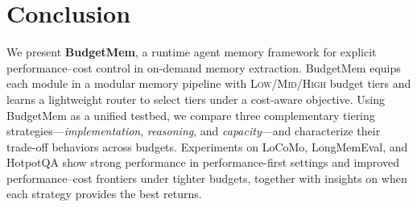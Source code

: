 \section{Conclusion}
\label{sec:conclusion}



We present \textbf{BudgetMem}, a runtime agent memory framework for explicit performance--cost control in on-demand memory extraction. BudgetMem equips each module in a modular memory pipeline with \textsc{Low}/\textsc{Mid}/\textsc{High} budget tiers and learns a lightweight router to select tiers under a cost-aware objective. Using BudgetMem as a unified testbed, we compare three complementary tiering strategies---\textit{implementation}, \textit{reasoning}, and \textit{capacity}---and characterize their trade-off behaviors across budgets. Experiments on LoCoMo, LongMemEval, and HotpotQA show strong performance in performance-first settings and improved performance--cost frontiers under tighter budgets, together with insights on when each strategy provides the best returns.





